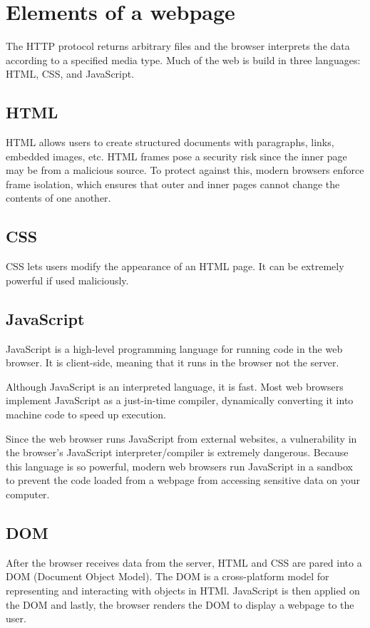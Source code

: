 \section{Elements of a webpage}
The HTTP protocol returns arbitrary files and the browser interprets the data according to a specified media type. Much of the web is build in three languages: HTML, CSS, and JavaScript.

\subsection{HTML}
HTML allows users to create structured documents with paragraphs, links, embedded images, etc. HTML frames pose a security risk since the inner page may be from a malicious source. To protect against this, modern browsers enforce frame isolation, which ensures that outer and inner pages cannot change the contents of one another.

\subsection{CSS}
CSS lets users modify the appearance of an HTML page. It can be extremely powerful if used maliciously.

\subsection{JavaScript}
JavaScript is a high-level programming language for running code in the web browser. It is client-side, meaning that it runs in the browser not the server. 

\medskip
Although JavaScript is an interpreted language, it is fast. Most web browsers implement JavaScript as a just-in-time compiler, dynamically converting it into machine code to speed up execution.

\medskip
Since the web browser runs JavaScript from external websites, a vulnerability in the browser's JavaScript interpreter/compiler is extremely dangerous. Because this language is so powerful, modern web browsers run JavaScript in a sandbox to prevent the code loaded from a webpage from accessing sensitive data on your computer.

\subsection{DOM}
After the browser receives data from the server, HTML and CSS are pared into a DOM (Document Object Model). The DOM is a cross-platform model for representing and interacting with objects in HTMl. JavaScript is then applied on the DOM and lastly, the browser renders the DOM to display a webpage to the user.

